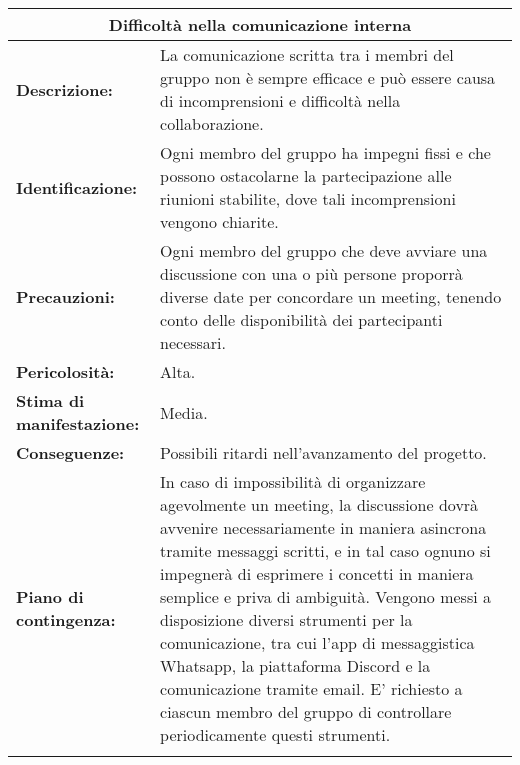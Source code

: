 \renewcommand\tabularxcolumn[1]{>{\Centering}m{#1}}
\begin{tabularx}{\textwidth}{ |X|X|}
\hline
\multicolumn{2}{|c|}{\textbf{Difficoltà nella comunicazione interna}} \\
\hline
\textbf{Descrizione:}& La comunicazione scritta tra i membri del gruppo non è sempre efficace e può essere causa di incomprensioni e difficoltà nella collaborazione. \\
\hline
\textbf{Identificazione:}& Ogni membro del gruppo ha impegni fissi e 
 che possono ostacolarne la partecipazione alle riunioni stabilite, dove 
tali incomprensioni vengono chiarite. \\
\hline
\textbf{Precauzioni:}& Ogni membro del gruppo che deve avviare una discussione con una o più persone proporrà diverse date per concordare un meeting, tenendo conto delle disponibilità dei partecipanti necessari. \\
\hline
\textbf{Pericolosità:}& Alta.\\
\hline
\textbf{Stima di manifestazione:}& Media.\\
\hline
\textbf{Conseguenze:}& Possibili ritardi nell'avanzamento del progetto.\\
\hline
\textbf{Piano di contingenza:}& In caso di impossibilità di organizzare agevolmente un meeting, la discussione dovrà avvenire necessariamente in maniera asincrona tramite messaggi scritti, e in tal caso ognuno si impegnerà di esprimere i concetti in maniera semplice e priva di ambiguità. Vengono messi a disposizione diversi strumenti per la comunicazione, tra cui l'app di messaggistica Whatsapp, la piattaforma Discord e la comunicazione tramite email. E' richiesto a ciascun membro del gruppo di controllare periodicamente questi strumenti. \\
\hline
\caption{Difficoltà nella comunicazione interna}
\end{tabularx}

